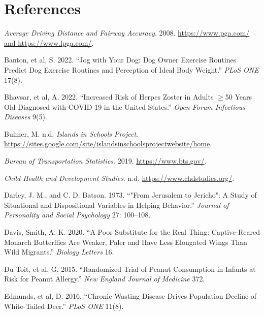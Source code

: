 \documentclass[
]{report}
\newlength{\cslhangindent}
\newenvironment{CSLReferences}[2] %
 {\begin{list}{}{%
  \setlength{\itemindent}{0pt}
  \setlength{\leftmargin}{0pt}
  \setlength{\parsep}{0pt}
  \ifodd #1
   \setlength{\leftmargin}{\cslhangindent}
   \setlength{\itemindent}{-1\cslhangindent}
  \fi
  \setlength{\itemsep}{#2\baselineskip}}}
 {\end{list}}
\begin{document}
\newpage

\chapter*{References}\label{references}

\protect{}\label{refs}
\begin{CSLReferences}{1}{1}
\emph{Average Driving Distance and Fairway Accuracy}. 2008. \href{https://www.pga.com/\%20and\%20https://www.lpga.com/}{https://www.pga.com/ and https://www.lpga.com/}.

{Banton, et al, S.} 2022. {``Jog with Your Dog: Dog Owner Exercise Routines Predict Dog Exercise Routines and Perception of Ideal Body Weight.''} \emph{PLoS ONE} 17(8).

{Bhavsar, et al, A.} 2022. {``Increased Risk of Herpes Zoster in Adults \(\geq\)50 Years Old Diagnosed with COVID-19 in the United States.''} \emph{Open Forum Infectious Diseases} 9(5).

Bulmer, M. n.d. \emph{Islands in Schools Project}. \url{https://sites.google.com/site/islandsinschoolsprojectwebsite/home}.

\emph{Bureau of Transportation Statistics}. 2019. \url{https://www.bts.gov/}.

\emph{Child Health and Development Studies}. n.d. \url{https://www.chdstudies.org/}.

Darley, J. M., and C. D. Batson. 1973. {``"From Jerusalem to Jericho": A Study of Situational and Dispositional Variables in Helping Behavior.''} \emph{Journal of Personality and Social Psychology} 27: 100--108.

Davis, Smith, A. K. 2020. {``A Poor Substitute for the Real Thing: Captive-Reared Monarch Butterflies Are Weaker, Paler and Have Less Elongated Wings Than Wild Migrants.''} \emph{Biology Letters} 16.

{Du Toit, et al, G.} 2015. {``Randomized Trial of Peanut Consumption in Infants at Risk for Peanut Allergy.''} \emph{New England Journal of Medicine} 372.

{Edmunds, et al, D.} 2016. {``Chronic Wasting Disease Drives Population Decline of White-Tailed Deer.''} \emph{PLoS ONE} 11(8).


\end{CSLReferences}
\end{document}
